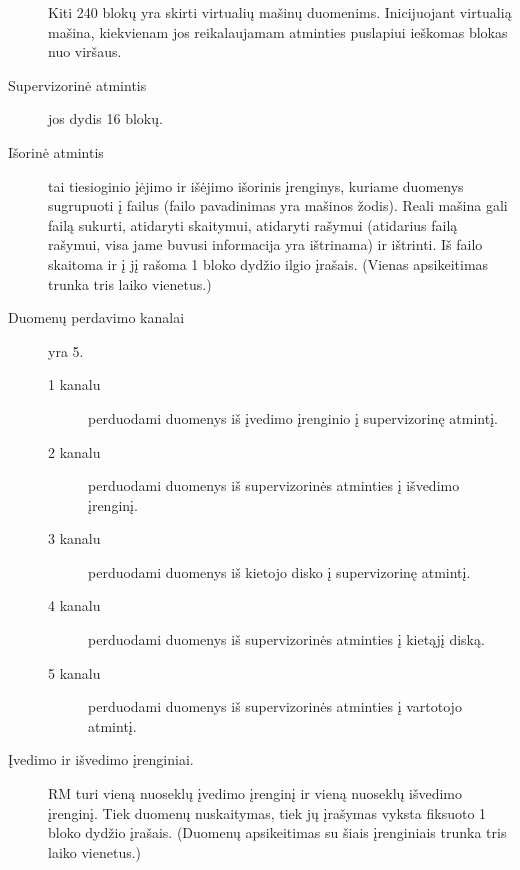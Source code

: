 \begin{description}
    Kiti 240 blokų yra skirti virtualių mašinų duomenims. 
    Inicijuojant virtualią mašina, kiekvienam jos reikalaujamam atminties
    puslapiui ieškomas blokas nuo viršaus.
  \item[Supervizorinė atmintis] jos dydis 16 blokų.
  \item[Išorinė atmintis] tai tiesioginio įėjimo ir išėjimo išorinis
    įrenginys, kuriame duomenys sugrupuoti į failus (failo pavadinimas
    yra mašinos žodis). Reali mašina gali failą sukurti, atidaryti
    skaitymui, atidaryti rašymui (atidarius failą rašymui, visa 
    jame buvusi informacija yra ištrinama) ir ištrinti. Iš failo skaitoma
    ir į jį rašoma 1 bloko dydžio ilgio įrašais. (Vienas apsikeitimas 
    trunka tris laiko vienetus.)
  \item[Duomenų perdavimo kanalai] yra 5. 
    \begin{description}
      \item[1 kanalu] perduodami duomenys iš įvedimo įrenginio į 
        supervizorinę atmintį.
      \item[2 kanalu] perduodami duomenys iš supervizorinės atminties
        į išvedimo įrenginį.
      \item[3 kanalu] perduodami duomenys iš kietojo disko į supervizorinę
        atmintį.
      \item[4 kanalu] perduodami duomenys iš supervizorinės atminties į 
        kietąjį diską.
      \item[5 kanalu] perduodami duomenys iš supervizorinės atminties į 
        vartotojo atmintį.
    \end{description}
  \item[Įvedimo ir išvedimo įrenginiai.] RM turi vieną nuoseklų įvedimo
    įrenginį ir vieną nuoseklų išvedimo įrenginį. Tiek duomenų nuskaitymas,
    tiek jų įrašymas vyksta fiksuoto 1 bloko dydžio įrašais. (Duomenų
    apsikeitimas su šiais įrenginiais trunka tris laiko vienetus.)
\end{description}
